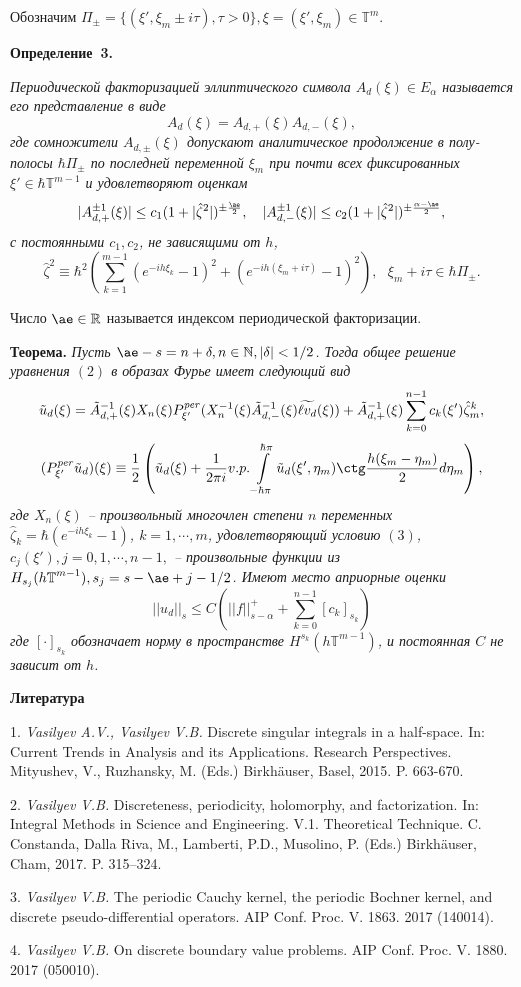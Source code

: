 Обозначим  $\Pi_{\pm}=\{(\xi',\xi_m\pm i\tau), \tau>0\}, \xi=(\xi',\xi_m)\in\mathbb T^m$.

\textbf{Определение~3.} {\it Периодической факторизацией эллиптического символа  $A_d(\xi)\in E_{\alpha}$ называется его представление в виде
\[
A_d(\xi)=A_{d,+}(\xi)A_{d,-}(\xi),
\]
где сомножители  $A_{d,\pm}(\xi)$ допускают аналитическое продолжение в полу-полосы  $\hbar\Pi_{\pm}$ по последней переменной  $\xi_m$
при почти всех фиксированных  $\xi'\in\hbar{\mathbb T}^{m-1}$ и удовлетворяют оценкам
\[
|A^{\pm 1}_{d,+}(\xi)|\leq c_1(1+|\hat\zeta^2|)^{\pm\frac{\ae}{2}},~~~|A^{\pm 1}_{d,-}(\xi)|\leq c_2(1+|\hat\zeta^2|)^{\pm\frac{{\alpha-\ae}}{2}},
\]
с постоянными $c_1, c_2$, не зависящими от $h$,
\[
\hat\zeta^2\equiv\hbar^2\left(\sum\limits_{k=1}^{m-1}(e^{-ih\xi_k}-1)^2+(e^{-ih(\xi_m+i\tau)}-1)^2\right),~~~\xi_m+i\tau\in\hbar\Pi_{\pm}.
\]

Число $\ae\in{\mathbb R}$ называется индексом периодической факторизации.

}

\textbf{Теорема.} {\it Пусть $\ae-s=n+\delta, n\in{\mathbb N}, |\delta|<1/2$. Тогда общее решение уравнения  $(2)$ в образах Фурье имеет следующий вид
\[
\tilde u_d(\xi)=\tilde A^{-1}_{d,+}(\xi)X_n(\xi)P^{\it per}_{\xi'}(X_n^{-1}(\xi)\tilde A^{-1}_{d,-}(\xi)\widetilde{\ell v_d}(\xi)) +\tilde A^{-1}_{d,+}(\xi)\sum\limits_{k=0}^{n-1}c_k(\xi')\hat\zeta_m^k,
\]
\[
(P_{\xi'}^{\it per}\tilde u_d)(\xi)\equiv\frac{1}{2}\left(\tilde u_d(\xi)+\frac{1}{2\pi i}v.p.\int\limits_{-\hbar\pi}^{\hbar\pi}{\tilde u_d(\xi',\eta_m)}\ctg\frac{h(\xi_m-\eta_m)}{2}d\eta_m\right),
\]
где $X_n(\xi)$ -- произвольный многочлен степени  $n$ переменных $\hat\zeta_k=\hbar(e^{-ih\xi_k}-1)$, $k=1,\cdots,m$, удовлетворяющий условию  $(3)$, $c_j(\xi'), j=0,1,\cdots,n-1,$ -- произвольные функции из  $H_{s_j}({h\mathbb T}^{m-1}), s_j=s-\ae+j-1/2$. Имеют место априорные оценки
\[
||u_d||_s\leq C(||f||^+_{s-\alpha}+\sum\limits_{k=0}^{n-1}[c_k]_{s_k})
\]
где $[\cdot]_{s_k}$ обозначает норму в пространстве $H^{s_k}({h\mathbb T}^{m-1})$, и постоянная $C$ не зависит от $h$.
}


\smallskip \centerline{\bf Литература}\nopagebreak

1. {\it Vasilyev A.V., Vasilyev V.B.} Discrete singular integrals in a half-space. In:
             Current Trends in Analysis and its Applications. Research Perspectives. Mityushev, V., Ruzhansky, M. (Eds.) Birkh\"auser, Basel, 2015. P. 663-670.

2. {\it	Vasilyev V.B.} Discreteness, periodicity, holomorphy, and factorization. In: Integral Methods in Science and Engineering. V.1. Theoretical Technique.  C. Constanda, Dalla Riva, M., Lamberti, P.D., Musolino, P. (Eds.)  Birkh\"auser, Cham, 2017. P. 315--324.

3. {\it Vasilyev V.B.} The periodic Cauchy kernel, the periodic Bochner kernel, and discrete pseudo-differential operators. AIP Conf. Proc.  V. 1863. 2017 (140014).

4. {\it Vasilyev V.B.} On discrete boundary value problems. AIP Conf. Proc. V. 1880. 2017 (050010).


